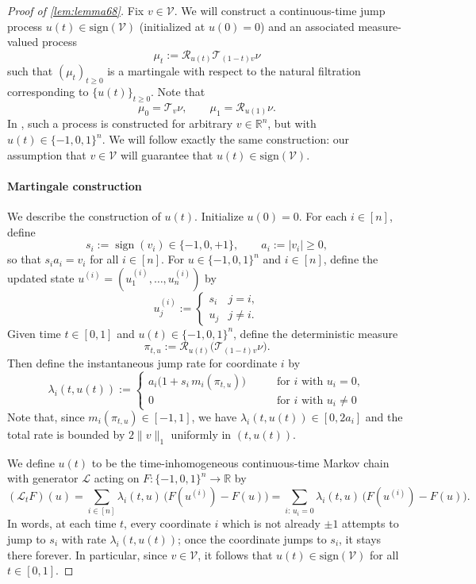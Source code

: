 \documentclass[11pt,reqno,letterpaper]{amsart}
\numberwithin{equation}{section}
\theoremstyle{definition}
\newcommand{\mc}{\mathcal}
\begin{document}
\begin{proof}[Proof of \cref{lem:lemma68}]
Fix $v \in \mathcal{V}$. We will construct a continuous-time jump process $u(t) \in \mathrm{sign}(\mathcal{V})$ (initialized at $u(0) = 0$) and an associated measure-valued process
\[\mu_t := \mathcal{R}_{u(t)} \mathcal{T}_{(1-t)v}\nu\]
such that $(\mu_t)_{t\geq 0}$ is a martingale with respect to the natural filtration corresponding to $\{u(t)\}_{t\geq 0}$. Note that
\[\mu_0 = \mathcal{T}_v \nu, \qquad \mu_1 = \mathcal{R}_{u(1)} \nu.\]
In \cite{chen2022localization}, such a process is constructed for arbitrary $v \in \mathbb{R}^n$, but with $u(t) \in \{-1,0,1\}^n$. We will follow exactly the same construction: our assumption that $v \in \mathcal{V}$ will guarantee that $u(t) \in \mathrm{sign}(\mc{V})$.\\  

\paragraph{\bf Martingale construction}
We describe the construction of $u(t)$. Initialize $u(0) = 0$. For each $i\in[n]$, define
\[
s_i:=\operatorname{sign}(v_i)\in\{-1,0,+1\},
\qquad
a_i:=|v_i|\ge 0,
\]
so that $s_i a_i = v_i$ for all $i \in [n]$. For $u\in \{-1,0,1\}^n$ and $i\in[n]$, define the updated state $u^{(i)} = (u^{(i)}_1,\dots, u^{(i)}_n)$ by
\[
u^{(i)}_j :=
\begin{cases}
s_i & j=i,\\
u_j & j\neq i.
\end{cases}
\]
Given time $t\in[0,1]$ and  $u(t) \in \{-1,0,1\}^n$, define the deterministic measure
\begin{equation}
\label{eq:pi_t_u_def_CE}
\pi_{t,u} := \mathcal{R}_{u(t)}\bigl(\mathcal{T}_{(1-t) v}\nu\bigr).
\end{equation}
Then define the instantaneous jump rate for coordinate $i$ by
\begin{equation}
\label{eq:lambda_def_CE}
\lambda_i(t,u(t))
:= \begin{cases}
a_i\bigl(1+s_i\,m_i(\pi_{t,u})\bigr)
&\qquad \text{for }i\text{ with }u_i=0,\\
0 &\qquad \text{for }i\text{ with }u_i \neq 0
\end{cases}
\end{equation}
Note that, since $m_i(\pi_{t,u})\in[-1,1]$, we have $\lambda_i(t,u(t))\in[0,2a_i]$ and the total rate is bounded by $2\|v\|_1$ uniformly in $(t,u(t))$.

We define $u(t)$ to be the time-inhomogeneous continuous-time Markov chain with generator $\mathcal{L}$ acting on  $F: \{-1,0,1\}^n \to\mathbb{R}$ by
\[
(\mathcal{L}_t F)(u)
= \sum_{i \in [n]} \lambda_i(t,u)\,\bigl(F(u^{(i)})-F(u)\bigr) = 
\sum_{i:\,u_i=0}\lambda_i(t,u)\,\bigl(F(u^{(i)})-F(u)\bigr).
\]
In words, at each time $t$, every coordinate $i$ which is not already $\pm 1$ attempts to jump to $s_i$ with rate $\lambda_i(t, u(t))$; once the coordinate jumps to $s_i$, it stays there forever. In particular, since $v \in \mathcal{V}$, it follows that $u(t) \in \mathrm{sign}(\mc{V})$ for all $t \in [0,1]$. 





\end{proof}
\end{document}
